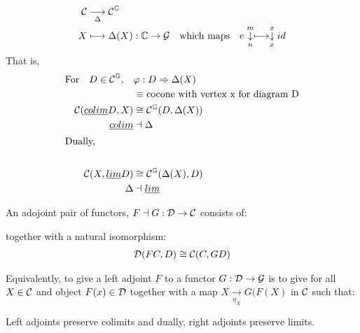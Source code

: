 \begin{example}[Colimits]
  \begin{align*}
    \mathcal{C} &\underset{\Delta}{\longrightarrow} \mathcal{C}^\mathbb{G} \\ 
    X &\longmapsto \Delta(X): \mathbb{C} \to \mathcal{G} \quad 
    \textrm{which maps} \quad
    e \overset{m}{\underset{n}{\downarrow}} \longmapsto
    \overset{x}{\underset{x}{\downarrow}}id
  \end{align*} 
That is, 
  \begin{align*}
    \textrm{For} \quad D \in \mathcal{C}^\mathbb{G},  \quad
    &\varphi: D \Rightarrow \Delta(X) \\
    &\equiv \textrm{cocone with vertex x for diagram D} \\
    \mathcal{C}(\underline{colim}D, X) &\cong 
      \mathcal{C}^{\mathbb{G}}(D, \Delta(X)) \\ 
    \underline{colim} &\dashv \Delta \\ 
    \shortintertext{Dually,} \\ 
    \mathcal{C}(X, \underline{lim}D) &\cong
      \mathcal{C}^{\mathbb{G}}(\Delta(X), D) \\
    \Delta &\dashv \underline{lim}  
  \end{align*}

\end{example}

\begin{definition}
An adojoint pair of functors, $F \dashv G: \mathcal{D} \to \mathcal{C}$ consists
of: 
 \begin{center}
\end{center}
together with a natural isomorphism:
\begin{align*}
\mathcal{D}(F C, D) &\cong 
  \mathcal{C}(C, G D) \\ 
\end{align*}

Equivalently, to give a left adjoint $F$ to a functor 
$G: \mathcal{D} \to \mathcal{G}$
is to give for all $X \in \mathcal{C}$
and object $F(x) \in \mathcal{D}$
together with a map $X \underset{\eta_X}{\rightarrow} G(F(X)$
in $\mathcal{C} $
such that: 
\begin{center}
\end{center}
\end{definition}
\begin{proposition}
  Left adjoints preserve colimits and dually, right adjoints preserve limits.
\end{proposition}

